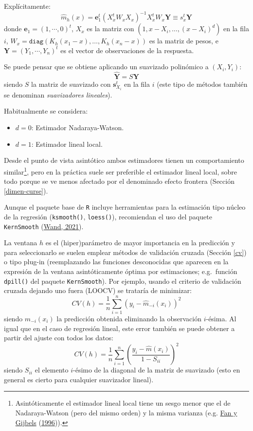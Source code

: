 \documentclass[
  spanish,
]{book}
\theoremstyle{break}
\theoremstyle{definition}
\theoremstyle{definition}
\theoremstyle{definition}
\theoremstyle{definition}
\theoremstyle{remark}
\begin{document}
Explícitamente:
\[\hat{m}_{h}(x) = \mathbf{e}_{1}^{t} \left(
X_{x}^{t} {W}_{x} 
X_{x} \right)^{-1} X_{x}^{t} 
{W}_{x}\mathbf{Y} \equiv {s}_{x}^{t}\mathbf{Y}\]
donde \(\mathbf{e}_{1} = \left( 1, \cdots, 0\right)^{t}\), \(X_{x}\)
es la matriz con \((1,x - X_i, \ldots, (x - X_i)^d)\) en la fila \(i\),
\(W_{x} = \mathtt{diag} \left( K_{h}(x_{1} - x), \ldots, K_{h}(x_{n} - x) \right)\)
es la matriz de pesos, e \(\mathbf{Y} = \left( Y_1, \cdots, Y_n\right)^{t}\) es el vector de observaciones de la respuesta.

Se puede pensar que se obtiene aplicando un suavizado polinómico a
\((X_i, Y_i)\):
\[\hat{\mathbf{Y}} = S\mathbf{Y}\]
siendo \(S\) la matriz de suavizado con \(\mathbf{s}_{X_{i}}^{t}\) en la fila \(i\) (este tipo de métodos también se denominan \emph{suavizadores lineales}).

Habitualmente se considera:

\begin{itemize}
\item
  \(d=0\): Estimador Nadaraya-Watson.
\item
  \(d=1\): Estimador lineal local.
\end{itemize}

Desde el punto de vista asintótico ambos estimadores tienen un comportamiento similar\footnote{Asintóticamente el estimador lineal local tiene un sesgo menor que el de Nadaraya-Watson (pero del mismo orden) y la misma varianza (e.g. \protect\hyperlink{ref-fan1996}{Fan y Gijbels} (\protect\hyperlink{ref-fan1996}{1996})).}, pero en la práctica suele ser preferible el estimador lineal local, sobre todo porque se ve menos afectado por el denominado efecto frontera (Sección \ref{dimen-curse}).

Aunque el paquete base de \texttt{R} incluye herramientas para la estimación tipo núcleo de la regresión (\texttt{ksmooth()}, \texttt{loess()}), recomiendan el uso del paquete \texttt{KernSmooth} (\protect\hyperlink{ref-R-KernSmooth}{Wand, 2021}).

La ventana \(h\) es el (hiper)parámetro de mayor importancia en la predicción y para seleccionarlo se suelen emplear métodos de validación cruzada (Sección \ref{cv}) o tipo plug-in (reemplazando las funciones desconocidas que aparecen en la expresión de la ventana asintóticamente óptima por estimaciones; e.g.~función \texttt{dpill()} del paquete \texttt{KernSmooth}).
Por ejemplo, usando el criterio de validación cruzada dejando uno fuera (LOOCV) se trataría de minimizar:
\[CV(h)=\frac{1}{n}\sum_{i=1}^n(y_i-\hat{m}_{-i}(x_i))^2\]
siendo \(\hat{m}_{-i}(x_i)\) la predicción obtenida eliminando la observación \(i\)-ésima.
Al igual que en el caso de regresión lineal, este error también se puede obtener a partir del ajuste con todos los datos:
\[CV(h)=\frac{1}{n}\sum_{i=1}^n\left(\frac{y_i-\hat{m}(x_i)}{1 - S_{ii}}\right)^2\]
siendo \(S_{ii}\) el elemento \(i\)-ésimo de la diagonal de la matriz de suavizado (esto en general es cierto para cualquier suavizador lineal).
\end{document}
